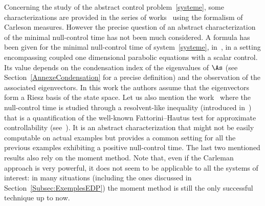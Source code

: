 Concerning the study of the abstract control problem~\eqref{systeme}, some characterizations are provided in the series of works~\cite{TheseGaunard,JacobPartingtonPott2007,JacobPartingtonPott2010, JacobPartingtonPott2013,JacobPartingtonPott2014} using the formalism of Carleson measures. However the precise question of an abstract characterization of the minimal null-control time has not been much considered. A formula has been given for the minimal null-control time of system~\eqref{systeme}, in~\cite{AmmarKhodjaBenabdallahGonzalez-BurgosdeTeresa:2014}, in a setting encompassing coupled one dimensional parabolic equations with a scalar control. Its value depends on the condensation index of the eigenvalues of $\As$ (see Section~\ref{AnnexeCondensation} for a precise definition) and the observation of the associated eigenvectors. In this work the authors assume that the eigenvectors form a Riesz basis of the state space. Let us also mention the work~\cite{AKBGBM_2018} where the null-control time is studied through a resolvent-like inequality (introduced in~\cite{DuyckaertsMiller12}) that is a quantification of the well-known Fattorini--Hautus test for approximate controllability (see~\cite{Fattorini66, Olive13}). It is an abstract characterization that might not be easily computable on actual examples but provides a common setting for all the previous examples exhibiting a positive null-control time. The last two mentioned results also rely on the moment method. Note that, even if the Carleman approach is very powerful, it does not seem to be applicable to all the systems of interest: in many situations (including the ones discussed in Section~\ref{Subsec:ExemplesEDP}) the moment method is still the only successful technique up to now.

